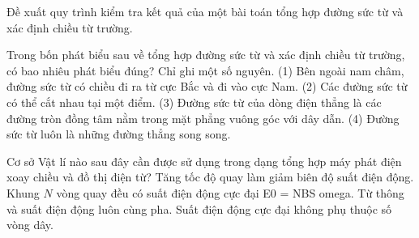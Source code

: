 \begin{bt}
Đề xuất quy trình kiểm tra kết quả của một bài toán tổng hợp đường sức từ và xác định chiều từ trường.
\end{bt}

\begin{ex}
Trong bốn phát biểu sau về tổng hợp đường sức từ và xác định chiều từ trường, có bao nhiêu phát biểu đúng? Chỉ ghi một số nguyên. (1) Bên ngoài nam châm, đường sức từ có chiều đi ra từ cực Bắc và đi vào cực Nam. (2) Các đường sức từ có thể cắt nhau tại một điểm. (3) Đường sức từ của dòng điện thẳng là các đường tròn đồng tâm nằm trong mặt phẳng vuông góc với dây dẫn. (4) Đường sức từ luôn là những đường thẳng song song.
\end{ex}

\begin{ex}
Cơ sở Vật lí nào sau đây cần được sử dụng trong dạng tổng hợp máy phát điện xoay chiều và đồ thị điện từ?
\choice
{Tăng tốc độ quay làm giảm biên độ suất điện động.}
{\True Khung $N$ vòng quay đều có suất điện động cực đại E0 = NBS omega.}
{Từ thông và suất điện động luôn cùng pha.}
{Suất điện động cực đại không phụ thuộc số vòng dây.}
\end{ex}

